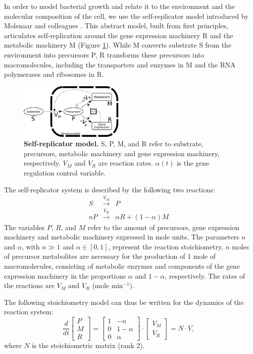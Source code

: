 \documentclass[10pt, conference]{ieeeconf}      %
\begin{document}
In order to model bacterial growth and relate it to the environment and the molecular composition of the cell, we use the self-replicator model introduced by Molenaar and colleagues \cite{molenaar_shifts_2009}.
This abstract model, built from first principles, articulates self-replication around the gene expression machinery R and the metabolic machinery M (Figure \ref{fig::selfrep}). While M converts substrate S from the environment into precursors P, R transforms these precursors into macromolecules, including the transporters and enzymes in M and the RNA polymerases and ribosomes in R.
\begin{figure}[htpb]
\centering
\includegraphics[width=0.45\textwidth]{./Fig/model_apr2014_baw.pdf}
\caption{\textbf{Self-replicator model.} S, P, M, and R refer to substrate, precursors, metabolic machinery and gene expression machinery, respectively.
$V_M$ and $V_R$ are reaction rates.
$\alpha(t)$ is the gene regulation control variable.
}
\label{fig::selfrep}
\end{figure}

The self-replicator system is described by the following two reactions:
\begin{eqnarray*}
S  &\overset{V_M}{\longrightarrow}& P \\
nP &\overset{V_R}{\longrightarrow}& \alpha R + (1-\alpha) M
\end{eqnarray*}
The variables $P$, $R$, and $M$ refer to the amount of precursors, gene expression machinery and metabolic machinery expressed in mole units.
The parameters $n$ and $\alpha$, with $n \gg 1$ and $\alpha \in [0,1]$, represent the reaction stoichiometry.
$n$ moles of precursor metabolites are necessary for the production of 1 mole of macromolecules, consisting of metabolic enzymes and components of the gene expression machinery in the proportions $\alpha$ and $1 - \alpha$, respectively.
The rates of the reactions are $V_M$ and $V_R$ (mole min$^{-1}$).

The following stoichiometry model can thus be written for the dynamics of the reaction system:
\begin{equation}
\frac{d}{dt} \left[
\begin{matrix}
P\\
M\\
R
\end{matrix}
\right] = \left[
\begin{matrix}
1 &-n\\
0 & 1 - \alpha\\
0 & \alpha
\end{matrix}
\right] \cdot \left[
\begin{matrix}
V_M \\ V_R
\end{matrix}
\right] = N\cdot V,
\end{equation}
where $N$ is the stoichiometric matrix (rank 2).
\end{document}
